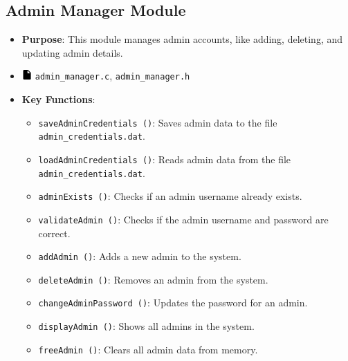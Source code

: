 \documentclass[12pt,a4paper]{report}
\begin{document}
\subsection{Admin Manager Module}
\begin{itemize}
    \item \normalsize \textbf{Purpose}: This module manages admin accounts, like adding, deleting, and updating admin details.
    \item \normalsize \includegraphics[width=0.03\textwidth]{../resources/assets/images/file_icon.png} \texttt{admin\_manager.c}, \texttt{admin\_manager.h}
    \item \normalsize \textbf{Key Functions}:
    \begin{itemize}
        \item \texttt{saveAdminCredentials ()}: Saves admin data to the file \texttt{admin\_credentials.dat}.
        \item \texttt{loadAdminCredentials ()}: Reads admin data from the file \texttt{admin\_credentials.dat}.
        \item \texttt{adminExists ()}: Checks if an admin username already exists.
        \item \texttt{validateAdmin ()}: Checks if the admin username and password are correct.
        \item \texttt{addAdmin ()}: Adds a new admin to the system.
        \item \texttt{deleteAdmin ()}: Removes an admin from the system.
        \item \texttt{changeAdminPassword ()}: Updates the password for an admin.
        \item \texttt{displayAdmin ()}: Shows all admins in the system.
        \item \texttt{freeAdmin ()}: Clears all admin data from memory.
    \end{itemize}
\end{itemize}
\end{document}
